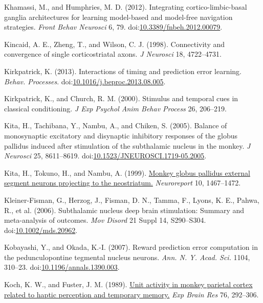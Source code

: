 \documentclass[
  11pt,
  a4paper,
]{scrbook}
\newlength{\cslhangindent}
\newenvironment{CSLReferences}[2] %
 {\begin{list}{}{%
  \setlength{\itemindent}{0pt}
  \setlength{\leftmargin}{0pt}
  \setlength{\parsep}{0pt}
  \ifodd #1
   \setlength{\leftmargin}{\cslhangindent}
   \setlength{\itemindent}{-1\cslhangindent}
  \fi
  \setlength{\itemsep}{#2\baselineskip}}}
 {\end{list}}
\begin{document}
\begin{CSLReferences}{1}{1}
Khamassi, M., and Humphries, M. D. (2012). Integrating
cortico-limbic-basal ganglia architectures for learning model-based and
model-free navigation strategies. \emph{Front Behav Neurosci} 6, 79.
doi:\href{https://doi.org/10.3389/fnbeh.2012.00079}{10.3389/fnbeh.2012.00079}.

Kincaid, A. E., Zheng, T., and Wilson, C. J. (1998). Connectivity and
convergence of single corticostriatal axons. \emph{J Neurosci} 18,
4722--4731.

Kirkpatrick, K. (2013). {Interactions of timing and prediction error
learning.} \emph{Behav. Processes}.
doi:\href{https://doi.org/10.1016/j.beproc.2013.08.005}{10.1016/j.beproc.2013.08.005}.

Kirkpatrick, K., and Church, R. M. (2000). Stimulus and temporal cues in
classical conditioning. \emph{J Exp Psychol Anim Behav Process} 26,
206--219.

Kita, H., Tachibana, Y., Nambu, A., and Chiken, S. (2005). Balance of
monosynaptic excitatory and disynaptic inhibitory responses of the
globus pallidus induced after stimulation of the subthalamic nucleus in
the monkey. \emph{J Neurosci} 25, 8611--8619.
doi:\href{https://doi.org/10.1523/JNEUROSCI.1719-05.2005}{10.1523/JNEUROSCI.1719-05.2005}.

Kita, H., Tokuno, H., and Nambu, A. (1999).
\href{https://www.ncbi.nlm.nih.gov/pubmed/10380964}{Monkey globus
pallidus external segment neurons projecting to the neostriatum.}
\emph{Neuroreport} 10, 1467--1472.

Kleiner-Fisman, G., Herzog, J., Fisman, D. N., Tamma, F., Lyons, K. E.,
Pahwa, R., et al. (2006). Subthalamic nucleus deep brain stimulation:
Summary and meta-analysis of outcomes. \emph{Mov Disord} 21 Suppl 14,
S290--S304.
doi:\href{https://doi.org/10.1002/mds.20962}{10.1002/mds.20962}.

Kobayashi, Y., and Okada, K.-I. (2007). {Reward prediction error
computation in the pedunculopontine tegmental nucleus neurons.}
\emph{Ann. N. Y. Acad. Sci.} 1104, 310--23.
doi:\href{https://doi.org/10.1196/annals.1390.003}{10.1196/annals.1390.003}.

Koch, K. W., and Fuster, J. M. (1989).
\href{https://www.ncbi.nlm.nih.gov/pubmed/2767186}{Unit activity in
monkey parietal cortex related to haptic perception and temporary
memory.} \emph{Exp Brain Res} 76, 292--306.


\end{CSLReferences}
\end{document}
